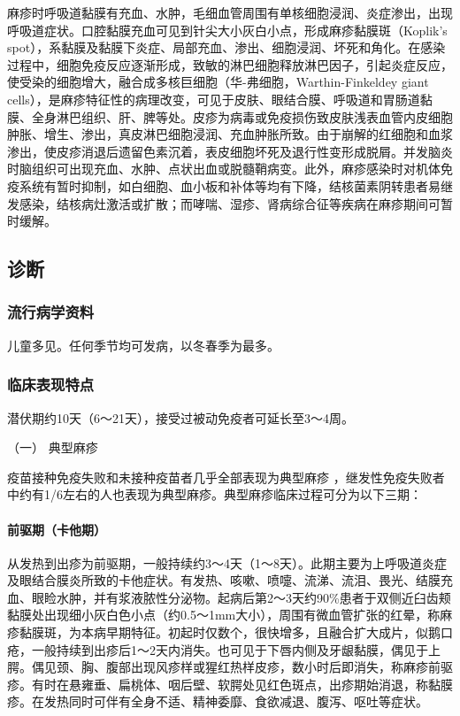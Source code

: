 麻疹时呼吸道黏膜有充血、水肿，毛细血管周围有单核细胞浸润、炎症渗出，出现呼吸道症状。口腔黏膜充血可见到针尖大小灰白小点，形成麻疹黏膜斑（Koplik's
spot），系黏膜及黏膜下炎症、局部充血、渗出、细胞浸润、坏死和角化。在感染过程中，细胞免疫反应逐渐形成，致敏的淋巴细胞释放淋巴因子，引起炎症反应，使受染的细胞增大，融合成多核巨细胞（华-弗细胞，Warthin-Finkeldey
giant
cells），是麻疹特征性的病理改变，可见于皮肤、眼结合膜、呼吸道和胃肠道黏膜、全身淋巴组织、肝、脾等处。皮疹为病毒或免疫损伤致皮肤浅表血管内皮细胞肿胀、增生、渗出，真皮淋巴细胞浸润、充血肿胀所致。由于崩解的红细胞和血浆渗出，使皮疹消退后遗留色素沉着，表皮细胞坏死及退行性变形成脱屑。并发脑炎时脑组织可出现充血、水肿、点状出血或脱髓鞘病变。此外，麻疹感染时对机体免疫系统有暂时抑制，如白细胞、血小板和补体等均有下降，结核菌素阴转患者易继发感染，结核病灶激活或扩散；而哮喘、湿疹、肾病综合征等疾病在麻疹期间可暂时缓解。

\subsection{诊断}

\subsubsection{流行病学资料}

儿童多见。任何季节均可发病，以冬春季为最多。

\subsubsection{临床表现特点}

潜伏期约10天（6～21天），接受过被动免疫者可延长至3～4周。

\hypertarget{text00217.htmlux5cux23CHP7-4-2-2-1}{}
（一） 典型麻疹

疫苗接种免疫失败和未接种疫苗者几乎全部表现为典型麻疹
，继发性免疫失败者中约有1/6左右的人也表现为典型麻疹。典型麻疹临床过程可分为以下三期：

\paragraph{前驱期（卡他期）}

从发热到出疹为前驱期，一般持续约3～4天（1～8天）。此期主要为上呼吸道炎症及眼结合膜炎所致的卡他症状。有发热、咳嗽、喷嚏、流涕、流泪、畏光、结膜充血、眼睑水肿，并有浆液脓性分泌物。起病后第2～3天约90\%患者于双侧近臼齿颊黏膜处出现细小灰白色小点（约0.5～1mm大小），周围有微血管扩张的红晕，称麻疹黏膜斑，为本病早期特征。初起时仅数个，很快增多，且融合扩大成片，似鹅口疮，一般持续到出疹后1～2天内消失。也可见于下唇内侧及牙龈黏膜，偶见于上腭。偶见颈、胸、腹部出现风疹样或猩红热样皮疹，数小时后即消失，称麻疹前驱疹。有时在悬雍垂、扁桃体、咽后壁、软腭处见红色斑点，出疹期始消退，称黏膜疹。在发热同时可伴有全身不适、精神委靡、食欲减退、腹泻、呕吐等症状。

